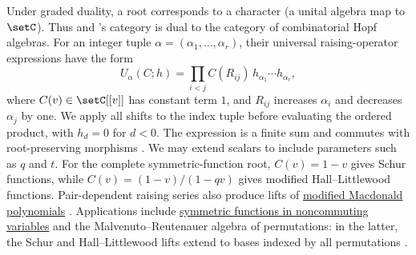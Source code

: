 Under graded duality, a root corresponds to a character (a unital algebra
map to $\setC$). Thus  and
's category is dual to the category of
combinatorial Hopf algebras.
For an integer tuple $\alpha=(\alpha_1,\dotsc,\alpha_r)$, their universal
raising-operator expressions have the form
\[
 U_\alpha(C;h)=\prod_{i<j}C(R_{ij})\,h_{\alpha_1}\dotsm h_{\alpha_r},
\]
where $C(v)\in\setC[[v]]$ has constant term $1$, and $R_{ij}$ increases
$\alpha_i$ and decreases $\alpha_j$ by one. We apply all shifts to the
index tuple before evaluating the ordered product, with $h_d=0$ for $d<0$.
The expression is a finite sum and commutes with root-preserving morphisms
\cite[Thm.~5.1]{AliniaeifardWilligenburg2026x}.
We may extend scalars to include parameters such as $q$ and $t$.
For the complete symmetric-function root, $C(v)=1-v$ gives Schur functions,
while $C(v)=(1-v)/(1-qv)$ gives modified Hall--Littlewood functions.
Pair-dependent raising series also produce lifts of
\hyperref[macdonaldH]{modified Macdonald polynomials}
\cite[Thm.~5.11]{AliniaeifardWilligenburg2026x}.
Applications include \hyperref[ncSchurRootedLifts]{symmetric functions in
noncommuting variables} and the Malvenuto--Reutenauer algebra of permutations:
in the latter, the Schur and Hall--Littlewood lifts extend to bases indexed
by all permutations \cite[Prop.~7.2]{AliniaeifardWilligenburg2026x}.
